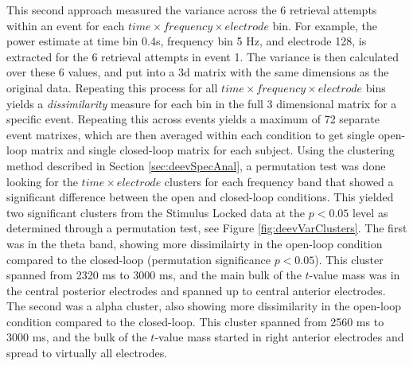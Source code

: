 \documentclass[11pt, titlepage, twoside]{article}
\begin{document}
This second approach measured the variance across the 6 retrieval attempts within an event for each $time \times frequency \times electrode$ bin.  For example, the power estimate at time bin 0.4s, frequency bin 5 Hz, and electrode 128, is extracted for the 6 retrieval attempts in event 1.  The variance is then calculated over these 6 values, and put into a 3d matrix with the same dimensions as the original data.  Repeating this process for all $time \times frequency \times electrode$ bins yields a \emph{dissimilarity} measure for each bin in the full 3 dimensional matrix for a specific event.  Repeating this across events yields a maximum of 72 separate event matrixes, which are then averaged within each condition to get single open-loop matrix and single closed-loop matrix for each subject.  Using the clustering method described in Section \ref{sec:deevSpecAnal}, a permutation test was done looking for the $time \times electrode$ clusters for each frequency band that showed a significant difference between the open and closed-loop conditions.  This yielded two significant clusters from the Stimulus Locked data at the $p<0.05$ level as determined through a permutation test, see Figure \ref{fig:deevVarClusters}.  The first was in the theta band, showing more dissimilairty in the open-loop condition compared to the closed-loop (permutation significance $p<0.05$).  This cluster spanned from 2320 ms to 3000 ms, and the main bulk of the $t$-value mass was in the central posterior electrodes and spanned up to central anterior electrodes. The second was a alpha cluster, also showing more dissimilarity in the open-loop condition compared to the closed-loop.  This cluster spanned from 2560 ms to 3000 ms, and the bulk of the $t$-value mass started in right anterior electrodes and spread to virtually all electrodes. 
\end{document}
